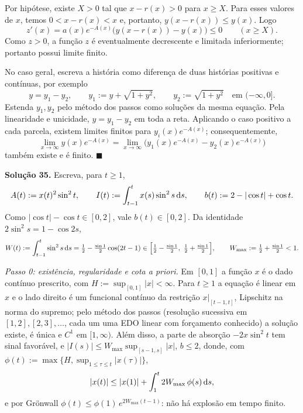 Por hipótese, existe $X>0$ tal que $x-r(x)>0$ para $x\ge X$. Para esses
valores de $x$, temos $0<x-r(x)<x$ e, portanto,
$y(x-r(x))\le y(x)$. Logo
\[
    z'(x)
    =a(x)e^{-A(x)}\bigl(y(x-r(x))-y(x)\bigr)\le0
    \qquad(x\ge X).
\]
Como $z>0$, a função $z$ é eventualmente decrescente e limitada
inferiormente; portanto possui limite finito.

No caso geral, escreva a história como diferença de duas histórias
positivas e contínuas, por exemplo
\[
    y=y_1-y_2,\qquad
    y_1:=y+\sqrt{1+y^2},\qquad y_2:=\sqrt{1+y^2}
    \quad\text{em }(-\infty,0].
\]
Estenda $y_1,y_2$ pelo método dos passos como soluções da mesma equação.
Pela linearidade e unicidade, $y=y_1-y_2$ em toda a reta. Aplicando o caso
positivo a cada parcela, existem limites finitos para
$y_i(x)e^{-A(x)}$; consequentemente,
\[
    \lim_{x\to\infty}y(x)e^{-A(x)}
    =
    \lim_{x\to\infty}
    \bigl(y_1(x)e^{-A(x)}-y_2(x)e^{-A(x)}\bigr)
\]
também existe e é finito. \qquad$\blacksquare$



\bigskip\noindent\textbf{Solução 35.}\quad
Escreva, para $t\ge1$,
\[
A(t):=x(t)^2\sin^2 t,\qquad I(t):=\int_{t-1}^t x(s)\sin^2 s\,\mathrm{d} s,\qquad b(t):=2-|\cos t|+\cos t.
\]
Como $|\cos t|-\cos t\in[0,2]$, vale $b(t)\in[0,2]$. Da identidade $2\sin^2 s=1-\cos 2s$,
\[
W(t):=\int_{t-1}^t\sin^2 s\,\d s=\tfrac12-\tfrac{\sin1}{2}\cos(2t-1)\in\Big[\tfrac12-\tfrac{\sin1}{2},\ \tfrac12+\tfrac{\sin1}{2}\Big],
\qquad W_{\max}:=\tfrac12+\tfrac{\sin1}{2}<1.
\]

\emph{Passo 0: existência, regularidade e cota a priori.}
Em $[0,1]$ a função $x$ é o dado contínuo prescrito, com $H:=\sup_{[0,1]}|x|<\infty$. Para $t\ge1$ a equação é linear em $x$ e o lado direito é um funcional contínuo da restrição $x|_{[t-1,t]}$, Lipschitz na norma do supremo; pelo método dos passos (resolução sucessiva em $[1,2],[2,3],\dots$, cada um uma EDO linear com forçamento conhecido) a solução existe, é única e $C^1$ em $[1,\infty)$. Além disso, a parte de absorção $-2x\sin^2 t$ tem sinal favorável, e $|I(s)|\le W_{\max}\sup_{[s-1,s]}|x|$, $b\le2$, donde, com $\phi(t):=\max\{H,\sup_{1\le\tau\le t}|x(\tau)|\}$,
\[
|x(t)|\le |x(1)|+\int_1^t 2W_{\max}\,\phi(s)\,\mathrm{d} s,
\]
e por Grönwall $\phi(t)\le \phi(1)\,e^{2W_{\max}(t-1)}$: não há explosão em tempo finito.

